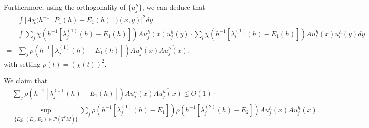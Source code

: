 \documentclass[12pt,reqno]{amsart}
\numberwithin{equation}{section}
\begin{document}
Furthermore, using the orthogonality of $\{u_j^h\}$, we can deduce that
\begin{align}\label{red2}
&\int \Big| A\chi\big(h^{-1}[P_1(h)-E_1(h)]\big) (x,y) \Big|^2 dy \nonumber\\
=& \int \sum_j \chi(h^{-1}[\lambda_j^{(1)}(h)-E_1(h)]) A u_j^h(x) \overline{u_j^h(y)} \cdot \sum_l \chi(h^{-1}[\lambda_l^{(1)}(h)-E_1(h)]) \overline{A u_l^h(x)} u_l^h(y) dy \nonumber \\
=& \sum_j \rho(h^{-1}[\lambda_j^{(1)}(h)-E_1(h)]) A u_j^h(x) \overline{A u_j^h(x)}.
\end{align}
with setting $\rho(t)=(\chi(t))^2$. 

We claim that
\begin{align}\label{upshot}
&\sum_j \rho(h^{-1}[\lambda_j^{(1)}(h)-E_1(h)]) A u_j^h(x) \overline{A u_j^h(x)} \leq 
O(1)\cdot \nonumber \\ &\sup_{\{E_2;\, (E_1,E_2)\in \mathcal{P}(T^*M)\}}\sum_j \rho(h^{-1}[\lambda_j^{(1)}(h)-E_1]) 
\rho(h^{-1}[\lambda_j^{(2)}(h)-E_2])  A u^h_j (x) \overline{A u^h_j(x)}.
\end{align}


\end{document}
